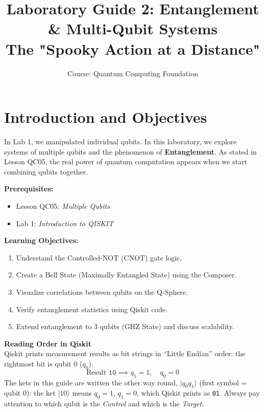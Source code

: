 \documentclass[a4paper,11pt]{article}
\title{\textbf{Laboratory Guide 2: Entanglement \& Multi-Qubit Systems}\\
\large The "Spooky Action at a Distance"}
\author{Course: Quantum Computing Foundation}
\date{}
\begin{document}
\maketitle

\section{Introduction and Objectives}
In Lab 1, we manipulated individual qubits. In this laboratory, we explore systems of multiple qubits and the phenomenon of \textbf{Entanglement}. As stated in Lesson QC05, the real power of quantum computation appears when we start combining qubits together.

\vspace{0.3cm}
\noindent \textbf{Prerequisites:}
\begin{itemize}
    \item Lesson QC05: \textit{Multiple Qubits}
    \item Lab 1: \textit{Introduction to QISKIT}
\end{itemize}

\noindent \textbf{Learning Objectives:}
\begin{enumerate}
    \item Understand the Controlled-NOT (CNOT) gate logic.
    \item Create a Bell State (Maximally Entangled State) using the Composer.
    \item Visualize correlations between qubits on the Q-Sphere.
    \item Verify entanglement statistics using Qiskit code.
    \item Extend entanglement to 3 qubits (GHZ State) and discuss scalability.
\end{enumerate}

\begin{warningbox}
\textbf{Reading Order in Qiskit}\\
Qiskit prints measurement results as bit strings in ``Little Endian'' order: the rightmost bit is qubit 0 ($q_0$).
\[ \text{Result } \texttt{10} \implies q_1 = 1, \quad q_0 = 0 \]
The kets in this guide are written the other way round, $|q_0 q_1\rangle$ (first symbol = qubit 0): the ket
$|10\rangle$ means $q_0 = 1$, $q_1 = 0$, which Qiskit prints as \texttt{01}.
Always pay attention to which qubit is the \textit{Control} and which is the \textit{Target}.
\end{warningbox}

\newpage
\end{document}
